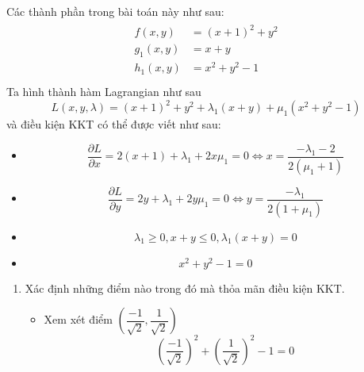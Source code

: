 \begin{solution}

    Các thành phần trong bài toán này như sau:
    \begin{align}
        \begin{aligned}
            f(x,y) &= (x+1)^2 + y^2\\
            g_1(x, y) &= x + y \\
            h_1(x,y) &= x^2 + y^2 - 1\\
        \end{aligned}
    \end{align}
    Ta hình thành hàm Lagrangian như sau
    \begin{equation}
        L(x,y, \lambda) = (x+1)^2 + y^2 + \lambda_1(x + y) + \mu_1(x^2 + y^2 - 1)
    \end{equation}
    và điều kiện KKT có thể được viết như sau:
    \begin{itemize}
        \item \begin{equation}
            \dfrac{\partial L}{\partial x} = 2(x+1) + \lambda_1 + 2x\mu_1 = 0 \Leftrightarrow x = \dfrac{-\lambda_1 - 2}{2(\mu_1 + 1)}
        \end{equation}
        \item \begin{equation}
            \dfrac{\partial L}{\partial y} = 2y + \lambda_1 + 2y\mu_1 = 0 \Leftrightarrow y = \dfrac{-\lambda_1}{2(1+\mu_1)}
        \end{equation}
        \item \begin{equation}
            \lambda_1 \geq 0, x + y \leq 0, \lambda_1(x + y) = 0
        \end{equation}
        \item \begin{equation}
            x^2 + y^2 - 1 = 0
        \end{equation}
    \end{itemize}
    \begin{enumerate}[label=(\alph*)]
        \item Xác định những điểm nào trong đó mà thỏa mãn điều kiện KKT.
        \begin{itemize}
            \item Xem xét điểm $\left(\dfrac{-1}{\sqrt{2}}, \dfrac{1}{\sqrt{2}}\right)$
            \begin{equation}
                \left(\dfrac{-1}{\sqrt{2}}\right)^2 + \left(\dfrac{1}{\sqrt{2}}\right)^2 - 1 = 0

\end{equation}
\end{itemize}
\end{enumerate}
\end{solution}

